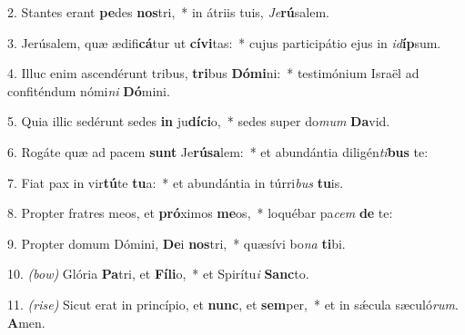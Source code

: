 2. Stantes erant \textbf{pe}des \textbf{nos}tri,~* in átriis tuis, \textit{Je}\textbf{rú}salem.

3. Jerúsalem, quæ ædifi\textbf{cá}tur ut \textbf{cí}\textbf{vi}tas:~* cujus participátio ejus in \textit{id}\textbf{íp}sum.

4. Illuc enim ascendérunt tribus, \textbf{tri}bus \textbf{Dó}\textbf{mi}ni:~* testimónium Israël ad confiténdum nómi\textit{ni} \textbf{Dó}mini.

5. Quia illic sedérunt sedes \textbf{in} ju\textbf{dí}\textbf{ci}o,~* sedes super do\textit{mum} \textbf{Da}vid.

6. Rogáte quæ ad pacem \textbf{sunt} Je\textbf{rú}\textbf{sa}lem:~* et abundántia diligén\textit{ti}\textbf{bus} te:

7. Fiat pax in vir\textbf{tú}te \textbf{tu}a:~* et abundántia in túrri\textit{bus} \textbf{tu}is.

8. Propter fratres meos, et \textbf{pró}ximos \textbf{me}os,~* loquébar pa\textit{cem} \textbf{de} te:

9. Propter domum Dómini, \textbf{De}i \textbf{nos}tri,~* quæsívi bo\textit{na} \textbf{ti}bi.

10. {\color{red}\textit{(bow)}} Glória \textbf{Pa}tri, et \textbf{Fí}\textbf{li}o,~* et Spirítu\textit{i} \textbf{Sanc}to.

11. {\color{red}\textit{(rise)}} Sicut erat in princípio, et \textbf{nunc}, et \textbf{sem}per,~* et in s\'{\ae}cula sæculó\textit{rum}. \textbf{A}men.